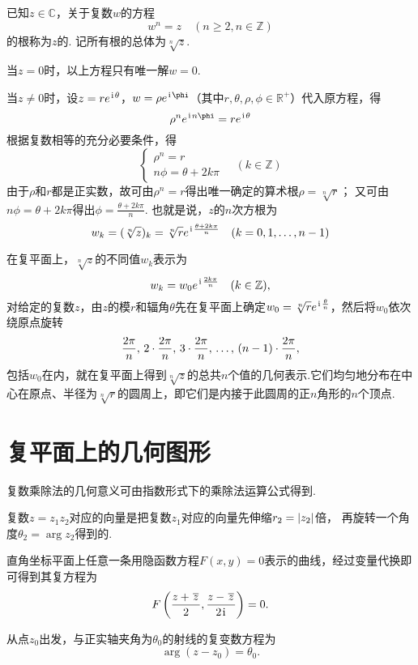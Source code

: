 \begin{definition}[复数的方根]
已知\(z\in\mathbb{C}\)，关于复数\(w\)的方程\[
w^n = z \quad (n \geq 2, n \in \mathbb{Z})
\]的根称为\(z\)的.
记所有根的总体为\(\sqrt[n]{z}\).

当\(z=0\)时，以上方程只有唯一解\(w = 0\).

当\(z \neq 0\)时，设\(z=re^{\kern1pt\mathrm{i}\kern1pt\theta}\)，\(w=\rho e^{\iu\phi}\)（其中\(r,\theta,\rho,\phi\in\mathbb{R}^+\)）代入原方程，得\[
\rho^n e^{\iu n \phi} = r e^{\iu\theta}
\]根据复数相等的充分必要条件，得\[
\left\{ \begin{array}{l}
\rho^n = r \\
n\phi = \theta + 2k\pi
\end{array} \right. \quad (k \in \mathbb{Z})
\]由于\(\rho\)和\(r\)都是正实数，故可由\(\rho^n=r\)得出唯一确定的算术根\(\rho=\sqrt[n]{r}\)；
又可由\(n\phi=\theta+2k\pi\)得出\(\phi=\frac{\theta+2k\pi}{n}\).
也就是说，\(z\)的\(n\)次方根为\[
w_k = (\sqrt[n]{z})_k = \sqrt[n]{r} e^{\kern1pt\mathrm{i}\kern1pt \frac{\theta + 2k\pi}{n}} \quad (k=0,1,\dotsc,n-1)
\]
\end{definition}

在复平面上，\(\sqrt[n]{z}\)的不同值\(w_k\)表示为\[
w_k = w_0 e^{\kern1pt\mathrm{i}\kern1pt\frac{2k\pi}{n}} \quad (k \in \mathbb{Z}),
\]对给定的复数\(z\)，由\(z\)的模\(r\)和辐角\(\theta\)先在复平面上确定\(w_0 = \sqrt[n]{r} e^{\kern1pt\mathrm{i}\kern1pt\frac{\theta}{n}}\)，然后将\(w_0\)依次绕原点旋转\[
\def\f{\frac{2\pi}{n}}
\f,\,2\cdot\f,\,3\cdot\f,\,\dots,\,(n-1)\cdot\f,
\]包括\(w_0\)在内，就在复平面上得到\(\sqrt[n]{z}\)的总共\(n\)个值的几何表示.它们均匀地分布在中心在原点、半径为\(\sqrt[n]{r}\)的圆周上，即它们是内接于此圆周的正\(n\)角形的\(n\)个顶点.

\section{复平面上的几何图形}
复数乘除法的几何意义可由指数形式下的乘除法运算公式得到.

复数\(z=z_1 z_2\)对应的向量是把复数\(z_1\)对应的向量先伸缩\(r_2 = \abs{z_2}\)倍，
再旋转一个角度\(\theta_2 = \arg z_2\)得到的.

直角坐标平面上任意一条用隐函数方程\(F(x,y)=0\)表示的曲线，经过变量代换即可得到其复方程为\[
F\left(\frac{z+\kern1pt\overline{z}\kern1pt}{2},\frac{z-\kern1pt\overline{z}\kern1pt}{2\kern1pt\mathrm{i}\kern1pt}\right)=0.
\]

\begin{example}[射线]
从点\(z_0\)出发，与正实轴夹角为\(\theta_0\)的射线的复变数方程为\[
\arg(z-z_0) = \theta_0.
\]
\end{example}

